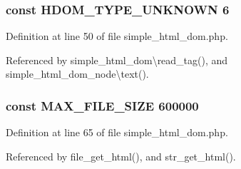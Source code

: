 \subsubsection[{H\+D\+O\+M\+\_\+\+T\+Y\+P\+E\+\_\+\+U\+N\+K\+N\+O\+W\+N}]{\setlength{\rightskip}{0pt plus 5cm}const H\+D\+O\+M\+\_\+\+T\+Y\+P\+E\+\_\+\+U\+N\+K\+N\+O\+W\+N 6}\label{simple__html__dom_8php_a1dc6000425365b26eb74247a720d3c33}


Definition at line 50 of file simple\+\_\+html\+\_\+dom.\+php.



Referenced by simple\+\_\+html\+\_\+dom\textbackslash{}read\+\_\+tag(), and simple\+\_\+html\+\_\+dom\+\_\+node\textbackslash{}text().

\hypertarget{simple__html__dom_8php_ae0113eb729c51976f55df15ad1c644c7}{}
\subsubsection[{M\+A\+X\+\_\+\+F\+I\+L\+E\+\_\+\+S\+I\+Z\+E}]{\setlength{\rightskip}{0pt plus 5cm}const M\+A\+X\+\_\+\+F\+I\+L\+E\+\_\+\+S\+I\+Z\+E 600000}\label{simple__html__dom_8php_ae0113eb729c51976f55df15ad1c644c7}


Definition at line 65 of file simple\+\_\+html\+\_\+dom.\+php.



Referenced by file\+\_\+get\+\_\+html(), and str\+\_\+get\+\_\+html().

